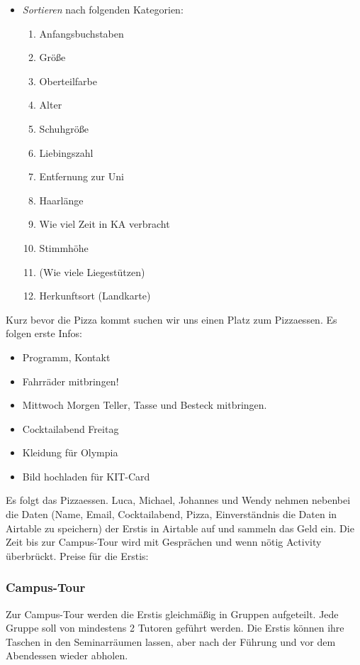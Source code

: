 \documentclass[10pt,twocolumn,ngerman]{scrartcl}
\begin{document}
\begin{itemize}
    \item \emph{Sortieren} nach folgenden Kategorien:
        \begin{enumerate}
            \item Anfangsbuchstaben
            \item Größe
            \item Oberteilfarbe
            \item Alter
            \item Schuhgröße
            \item Liebingszahl
            \item Entfernung zur Uni
            \item Haarlänge
            \item Wie viel Zeit in KA verbracht
            \item Stimmhöhe
            \item (Wie viele Liegestützen)
            \item Herkunftsort (Landkarte)
        \end{enumerate}
\end{itemize}

Kurz bevor die Pizza kommt suchen wir uns einen Platz zum Pizzaessen.
Es folgen erste Infos:
\begin{itemize}
    \item Programm, Kontakt
    \item Fahrräder mitbringen!
    \item Mittwoch Morgen Teller, Tasse und Besteck mitbringen.
    \item Cocktailabend Freitag
    \item Kleidung für Olympia
    \item Bild hochladen für KIT-Card
\end{itemize}
Es folgt das Pizzaessen. Luca, Michael, Johannes und Wendy nehmen
nebenbei die Daten (Name, Email, Cocktailabend, Pizza, Einverständnis
die Daten in Airtable zu speichern) der Erstis in Airtable auf und
sammeln das Geld ein. Die Zeit bis zur Campus-Tour wird mit Gesprächen
und wenn nötig Activity überbrückt. Preise für die Erstis:

\subsubsection{Campus-Tour}

Zur Campus-Tour werden die Erstis gleichmäßig in Gruppen aufgeteilt.
Jede Gruppe soll von mindestens 2 Tutoren geführt werden. Die Erstis
können ihre Taschen in den Seminarräumen lassen, aber nach der Führung
und vor dem Abendessen wieder abholen.
\end{document}
